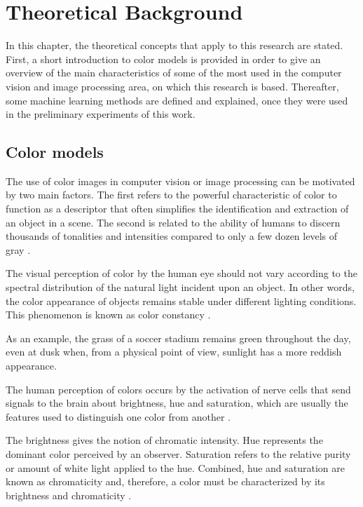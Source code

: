 \chapter{Theoretical Background}
\label{cap:conceitos}
In this chapter, the theoretical concepts that apply to this research are stated. First, a short introduction to color models is provided in order to give an overview of the main characteristics of some of the most used in the computer vision and image processing area, on which this research is based. Thereafter, some machine learning methods are defined and explained, once they were used in the preliminary experiments of this work.                                                                                                                               

\section{Color models}
\label{sec:fundamentos}

The use of color images in computer vision or image processing can be motivated by two main factors. The first refers to the powerful characteristic of color to function as a descriptor that often simplifies the identification and extraction of an object in a scene. The second is related to the ability of humans to discern thousands of tonalities and intensities compared to only a few dozen levels of gray \citep{gonzalez:02}.

The visual perception of color by the human eye should not vary according to the spectral distribution of the natural light incident upon an object. In other words, the color appearance of objects remains stable under different lighting conditions. This phenomenon is known as color constancy \citep{gevers:12}.

As an example, the grass of a soccer stadium remains green throughout the day, even at dusk when, from a physical point of view, sunlight has a more reddish appearance.

The human perception of colors occurs by the activation of nerve cells that send signals to the brain about brightness, hue and saturation, which are usually the features used to distinguish one color from another \citep{gonzalez:02}.

The brightness gives the notion of chromatic intensity. Hue represents the dominant color perceived by an observer. Saturation refers to the relative purity or amount of white light applied to the hue. Combined, hue and saturation are known as chromaticity and, therefore, a color must be characterized by its brightness and chromaticity \citep{gonzalez:02}.

